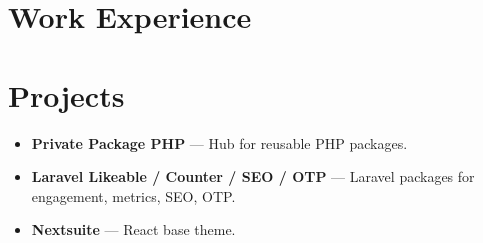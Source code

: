 \documentclass[11pt,a4paper]{article}
\begin{document}

\section*{Work Experience}

\section*{Projects}
\begin{itemize}
  \item \textbf{Private Package PHP} --- Hub for reusable PHP packages.
  \item \textbf{Laravel Likeable / Counter / SEO / OTP} --- Laravel packages for engagement, metrics, SEO, OTP.
  \item \textbf{Nextsuite} --- React base theme.
\end{itemize}

\end{document}
